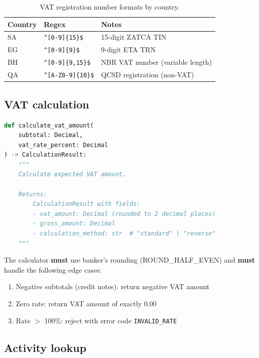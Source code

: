 \documentclass[11pt,a4paper,twoside]{report}
\begin{document}
\begin{table}[htbp]
\centering
\caption{VAT registration number formats by country.}
\label{tab:vat-formats}
\footnotesize
\begin{tabularx}{\linewidth}{@{}l l X@{}}
\toprule
\textbf{Country} & \textbf{Regex} & \textbf{Notes} \\ \midrule
SA & \verb|^[0-9]{15}$| & 15-digit ZATCA TIN \\
EG & \verb|^[0-9]{9}$| & 9-digit ETA TRN \\
BH & \verb|^[0-9]{9,15}$| & NBR VAT number (variable length) \\
QA & \verb|^[A-Z0-9]{10}$| & QCSD registration (non-VAT) \\
\bottomrule
\end{tabularx}
\end{table}

\subsection{VAT calculation}

\begin{lstlisting}[language=Python,basicstyle=\ttfamily\small,caption={VAT calculator API contract.}]
def calculate_vat_amount(
    subtotal: Decimal,
    vat_rate_percent: Decimal
) -> CalculationResult:
    """
    Calculate expected VAT amount.
    
    Returns:
        CalculationResult with fields:
        - vat_amount: Decimal (rounded to 2 decimal places)
        - gross_amount: Decimal
        - calculation_method: str  # "standard" | "reverse"
    """
\end{lstlisting}

The calculator \textbf{must} use banker's rounding (ROUND\_HALF\_EVEN) and
\textbf{must} handle the following edge cases:

\begin{enumerate}
  \item Negative subtotals (credit notes): return negative VAT amount
  \item Zero rate: return VAT amount of exactly 0.00
  \item Rate $>$ 100\%: reject with error code \texttt{INVALID\_RATE}
\end{enumerate}

\subsection{Activity lookup}
\end{document}

